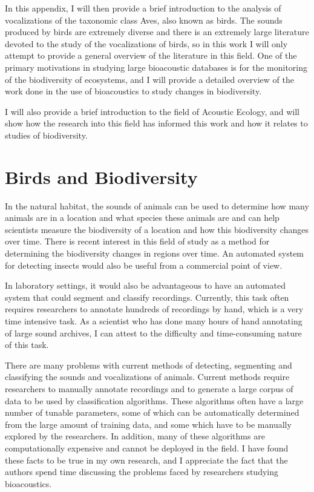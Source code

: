 \documentclass[12pt,oneside]{book}
\begin{document}
In this appendix, I will then provide a brief introduction to the
analysis of vocalizations of the taxonomic class Aves, also known as
birds.  The sounds produced by birds are extremely diverse and there
is an extremely large literature devoted to the study of the
vocalizations of birds, so in this work I will only attempt to provide
a general overview of the literature in this field.  One of the
primary motivations in studying large bioacoustic databases is for the
monitoring of the biodiversity of ecosystems, and I will provide a
detailed overview of the work done in the use of bioacoustics to study
changes in biodiversity.

I will also provide a brief introduction to the field of Acoustic
Ecology, and will show how the research into this field has informed
this work and how it relates to studies of biodiversity.

\section{Birds and Biodiversity}

In the natural habitat, the sounds of animals can be used to determine
how many animals are in a location and what species these animals are
and can help scientists measure the biodiversity of a location and how
this biodiversity changes over time.  There is recent interest in this
field of study \cite{wimmer2010scaling} as a method for determining
the biodiversity changes in regions over time.  An automated system
for detecting insects would also be useful from a commercial point of
view.

In laboratory settings, it would also be advantageous to have an
automated system that could segment and classify recordings.
Currently, this task often requires researchers to annotate hundreds
of recordings by hand, which is a very time intensive task.  As a
scientist who has done many hours of hand annotating of large sound
archives, I can attest to the difficulty and time-consuming nature of
this task.

There are many problems with current methods of detecting, segmenting
and classifying the sounds and vocalizations of animals.  Current
methods require researchers to manually annotate recordings and to
generate a large corpus of data to be used by classification
algorithms.  These algorithms often have a large number of tunable
parameters, some of which can be automatically determined from the
large amount of training data, and some which have to be manually
explored by the researchers.  In addition, many of these algorithms
are computationally expensive and cannot be deployed in the field.  I
have found these facts to be true in my own research, and I appreciate
the fact that the authors spend time discussing the problems faced by
researchers studying bioacoustics.
\end{document}
